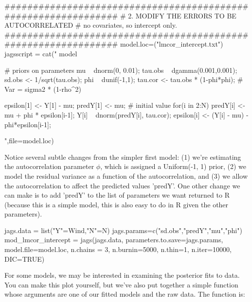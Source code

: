 \begin{Schunk}
\begin{Sinput}
 ###############################################################
 # 2. MODIFY THE ERRORS TO BE AUTOCORRELATED 
 # no covariates, so intercept only. 
 ###############################################################
 model.loc=("lmcor_intercept.txt")
 jagsscript = cat("
 model {  
    # priors on parameters
    mu ~ dnorm(0, 0.01); 
    tau.obs ~ dgamma(0.001,0.001); 
    sd.obs <- 1/sqrt(tau.obs); 
    phi ~ dunif(-1,1);
    tau.cor <- tau.obs * (1-phi*phi); # Var = sigma2 * (1-rho^2)
    
    epsilon[1] <- Y[1] - mu;
    predY[1] <- mu; # initial value
    for(i in 2:N) {
       predY[i] <- mu + phi * epsilon[i-1]; 
       Y[i] ~ dnorm(predY[i], tau.cor);
       epsilon[i] <- (Y[i] - mu) - phi*epsilon[i-1];
    }
 }
 ",file=model.loc)
\end{Sinput}
\end{Schunk}

Notice several subtle changes from the simpler first model: (1) we're estimating the autocorrelation parameter $\phi$, which is assigned a Uniform(-1, 1) prior, (2) we model the residual variance as a function of the autocorrelation, and (3) we allow the autocorrelation to affect the predicted values 'predY'. One other change we can make is to add 'predY' to the list of parameters we want returned to R (because this is a simple model, this is also easy to do in R given the other parameters).

\begin{Schunk}
\begin{Sinput}
 jags.data = list("Y"=Wind,"N"=N)
 jags.params=c("sd.obs","predY","mu","phi")
 mod_lmcor_intercept = jags(jags.data, parameters.to.save=jags.params, 
         model.file=model.loc, n.chains = 3, n.burnin=5000,
         n.thin=1, n.iter=10000, DIC=TRUE)   
\end{Sinput}
\end{Schunk}

For some models, we may be interested in examining the posterior fits to data. You can make this plot yourself, but we've also put together a simple function whose arguments are one of our fitted models and the raw data. The function is: 

\begin{Schunk}
\end{Schunk}

